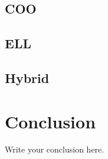 \documentclass{article}
\begin{document}
\subsection{COO}

\subsection{ELL}

\subsection{Hybrid}


\section{Conclusion}
Write your conclusion here.
\end{document}
